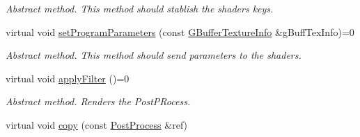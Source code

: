 \begin{DoxyCompactItemize}
\begin{DoxyCompactList}\small\item\em Abstract method. This method should stablish the shaders keys. \end{DoxyCompactList}\item 
\mbox{\label{class_geometry_engine_1_1_geometry_post_process_1_1_post_process_ae4bd80f5d0f0768fd4e2141a95ff5bb0}} 
virtual void \mbox{\hyperlink{class_geometry_engine_1_1_geometry_post_process_1_1_post_process_ae4bd80f5d0f0768fd4e2141a95ff5bb0}{set\+Program\+Parameters}} (const \mbox{\hyperlink{struct_geometry_engine_1_1_g_buffer_texture_info}{G\+Buffer\+Texture\+Info}} \&g\+Buff\+Tex\+Info)=0
\begin{DoxyCompactList}\small\item\em Abstract method. This method should send parameters to the shaders. \end{DoxyCompactList}\item 
\mbox{\label{class_geometry_engine_1_1_geometry_post_process_1_1_post_process_acbd697b4103a9e8c897b8c073350e5a2}} 
virtual void \mbox{\hyperlink{class_geometry_engine_1_1_geometry_post_process_1_1_post_process_acbd697b4103a9e8c897b8c073350e5a2}{apply\+Filter}} ()=0
\begin{DoxyCompactList}\small\item\em Abstract method. Renders the Post\+P\+Rocess. \end{DoxyCompactList}\item 
virtual void \mbox{\hyperlink{class_geometry_engine_1_1_geometry_post_process_1_1_post_process_aba093c175b228894204e785a5a54e6e9}{copy}} (const \mbox{\hyperlink{class_geometry_engine_1_1_geometry_post_process_1_1_post_process}{Post\+Process}} \&ref)
\end{DoxyCompactItemize}
